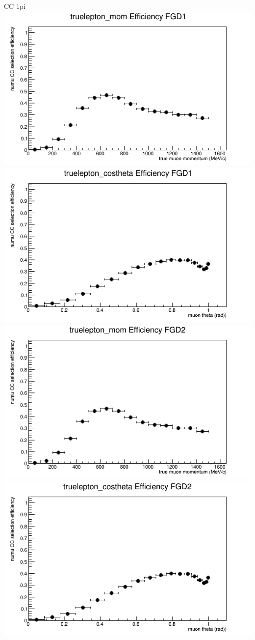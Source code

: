 \documentclass{beamer}
\begin{document}
\begin{frame}{CC 1pi}
\center
\includegraphics[width=.45\textwidth]{images/Eff_truelepton_mom_topology_CC 1pi_accum_level[][0][55]_data_mc.png}
\includegraphics[width=.45\textwidth]{images/Eff_truelepton_costheta_topology_CC 1pi_accum_level[][0][55]_data_mc.png}
\includegraphics[width=.45\textwidth]{images/Eff_truelepton_mom_fgd2topology_CC 1pi_accum_level[][1][55]_data_mc.png}
\includegraphics[width=.45\textwidth]{images/Eff_truelepton_costheta_fgd2topology_CC 1pi_accum_level[][1][55]_data_mc.png}
\end{frame}
\end{document}
